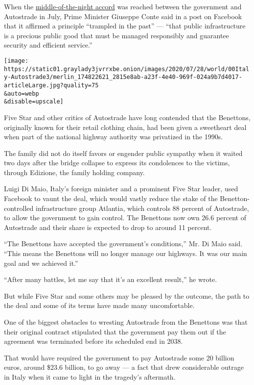 When the
\href{http://www.governo.it/it/articolo/consiglio-dei-ministri-n-56/14926}{middle-of-the-night
accord} was reached between the government and Autostrade in July, Prime
Minister Giuseppe Conte said in a post on Facebook that it affirmed a
principle ``trampled in the past'' --- ``that public infrastructure is a
precious public good that must be managed responsibly and guarantee
security and efficient service.''

\texttt{[image: https://static01.graylady3jvrrxbe.onion/images/2020/07/28/world/00Italy-Autostrade3/merlin\_174822621\_2815e8ab-a23f-4e40-969f-024a9b7d4017-articleLarge.jpg?quality=75\\\&auto=webp\\\&disable=upscale]}

Five Star and other critics of Autostrade have long contended that the
Benettons, originally known for their retail clothing chain, had been
given a sweetheart deal when part of the national highway authority was
privatized in the 1990s.

The family did not do itself favors or engender public sympathy when it
waited two days after the bridge collapse to express its condolences to
the victims, through Edizione, the family holding company.

Luigi Di Maio, Italy's foreign minister and a prominent Five Star
leader, used Facebook to vaunt the deal, which would vastly reduce the
stake of the Benetton-controlled infrastructure group Atlantia, which
controls 88 percent of Autostrade, to allow the government to gain
control. The Benettons now own 26.6 percent of Autostrade and their
share is expected to drop to around 11 percent.

``The Benettons have accepted the government's conditions,'' Mr. Di Maio
said. ``This means the Benettons will no longer manage our highways. It
was our main goal and we achieved it.''

``After many battles, let me say that it's an excellent result,'' he
wrote.

But while Five Star and some others may be pleased by the outcome, the
path to the deal and some of its terms have made many uncomfortable.

One of the biggest obstacles to wresting Autostrade from the Benettons
was that their original contract stipulated that the government pay them
out if the agreement was terminated before its scheduled end in 2038.

That would have required the government to pay Autostrade some 20
billion euros, around \$23.6 billion, to go away --- a fact that drew
considerable outrage in Italy when it came to light in the tragedy's
aftermath.

